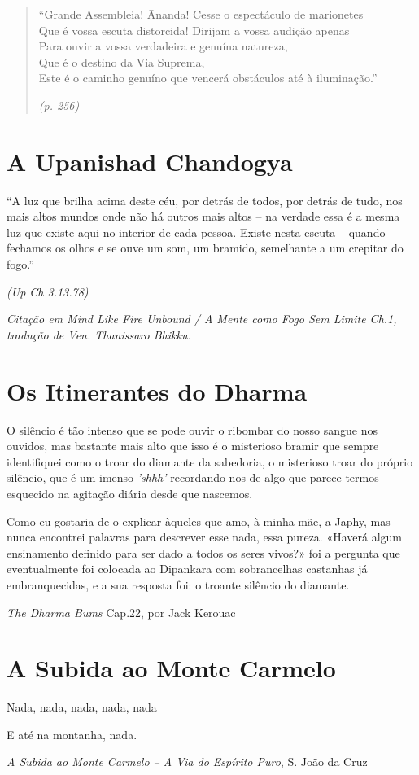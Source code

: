 \begin{quotation}
``Grande Assembleia! Ānanda! Cesse o espectáculo de marionetes\\
Que é vossa escuta distorcida! Dirijam a vossa audição apenas\\
Para ouvir a vossa verdadeira e genuína natureza,\\
Que é o destino da Via Suprema,\\
Este é o caminho genuíno que vencerá obstáculos até à iluminação.''

\emph{(p. 256)}
\end{quotation}

\clearpage

\section*{A Upanishad Chandogya}

``A luz que brilha acima deste céu, por detrás de todos, por detrás de
tudo, nos mais altos mundos onde não há outros mais altos -- na verdade
essa é a mesma luz que existe aqui no interior de cada pessoa. Existe
nesta escuta -- quando fechamos os olhos e se ouve um som, um bramido,
semelhante a um crepitar do fogo.''

\emph{(Up Ch 3.13.78)}

{\small\itshape
  Citação em \emph{Mind Like Fire Unbound} / \emph{A Mente como Fogo Sem Limite}
  Ch.1, tradução de Ven. Thanissaro Bhikku.
}

\section*{Os Itinerantes do Dharma}

O silêncio é tão intenso que se pode ouvir o ribombar do nosso sangue
nos ouvidos, mas bastante mais alto que isso é o misterioso bramir que
sempre identifiquei como o troar do diamante da sabedoria, o misterioso
troar do próprio silêncio, que é um imenso \emph{'shhh'} recordando-nos
de algo que parece termos esquecido na agitação diária desde que
nascemos.

Como eu gostaria de o explicar àqueles que amo, à minha mãe, a Japhy,
mas nunca encontrei palavras para descrever esse nada, essa pureza.
«Haverá algum ensinamento definido para ser dado a todos os seres
vivos?» foi a pergunta que eventualmente foi colocada ao Dipankara com
sobrancelhas castanhas já embranquecidas, e a sua resposta foi: o
troante silêncio do diamante.

\emph{The Dharma Bums} Cap.22, por Jack Kerouac

\clearpage

\section*{A Subida ao Monte Carmelo}

Nada, nada, nada, nada, nada

E até na montanha, nada.

\emph{A Subida ao Monte Carmelo -- A Via do Espírito Puro}, S. João da
Cruz

\setlength{\parskip}{0pt}
\setlength{\parindent}{17pt}
